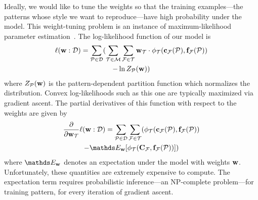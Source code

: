 Ideally, we would like to tune the weights so that the training examples---the patterns whose style we want to reproduce---have high probability under the model. This weight-tuning problem is an instance of maximum-likelihood parameter estimation~\cite{PGMBook}. The log-likelihood function of our model is
\begin{multline*}
\ell(\mathbf{w} : \mathcal{D}) =
	\sum_{\mathcal{P} \in \mathcal{D}}
	(
		\sum_{\mathcal{T} \in \mathcal{M}}
			\sum_{\mathcal{F} \in \mathcal{T}}
				\mathbf{w}_{\mathcal{T}} \cdot \phi_{\mathcal{T}}(\mathbf{c_{\mathcal{F}}}(\mathcal{P}),\mathbf{f_{\mathcal{F}}}(\mathcal{P})) \\
		- \ln{Z_{\mathcal{P}}(\mathbf{w})}
	)
\end{multline*}
where $Z_{\mathcal{P}}(\mathbf{w})$ is the pattern-dependent partition function which normalizes the distribution. Convex log-likelihoods such as this one are typically maximized via gradient ascent. The partial derivatives of this function with respect to the weights are given by
\begin{multline*}
\frac{\partial}{\partial \weights_\template} \ell(\weights : \dataset) = 
	\sum_{\pattern \in \dataset}
		\sum_{\factor \in \template}
		(
			\stats{\template}{\variable{c_\factor}(\pattern)}{\variable{f_\factor}(\pattern)} \\
				- \expectation_\weights[\stats{\template}{\variable{C_\factor}}{\variable{f_\factor}(\pattern)}]
		)
\end{multline*}
where $\expectation_\weights$ denotes an expectation under the model with weights $\mathbf{w}$. Unfortunately, these quantities are extremely expensive to compute. The expectation term requires probabilistic inference---an NP-complete problem---for training pattern, for every iteration of gradient ascent.

